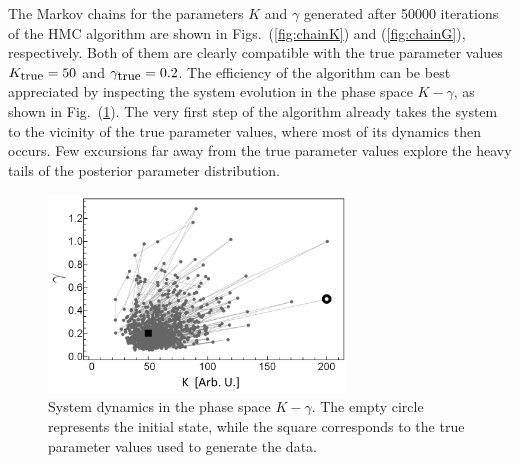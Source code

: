 \documentclass[12pt,a4paper,final]{iopart}
\begin{document}
The Markov chains for the parameters $K$ and $\gamma$ generated after 50000 iterations of the HMC algorithm are shown in Figs.~(\ref{fig:chainK}) and (\ref{fig:chainG}), respectively. Both of them are clearly compatible with the true parameter values $K_{\mbox{\small true}} = 50$ and $\gamma_{\mbox{\small true}}=0.2$.
The efficiency of the algorithm can be best appreciated by inspecting the system evolution in the phase space $K-\gamma$, as shown in Fig.~(\ref{fig:phase_space_evol}). The very first step of the algorithm already takes the system to the vicinity of the true parameter values, where most of its dynamics then occurs. Few excursions far away from the true parameter values explore the heavy tails of the posterior parameter distribution.
%
\begin{figure}[htb!]
    \centering
    \includegraphics[width=0.7\textwidth]{Figs/FigPhaseSpaceEvol.png}
    \caption{System dynamics in the phase space $K-\gamma$. The empty circle represents the initial state, while the square corresponds to the true parameter values used to generate the data.}
    \label{fig:phase_space_evol}
\end{figure}
\end{document}
